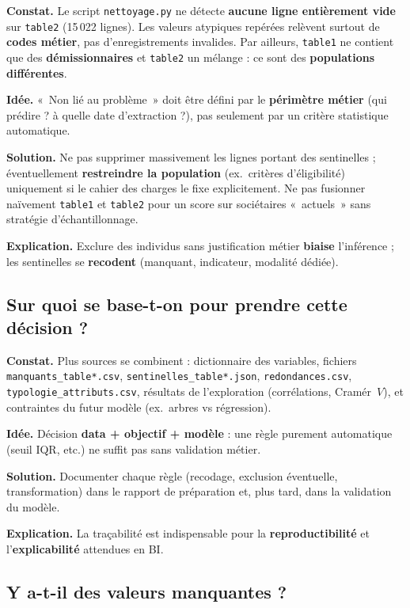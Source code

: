 \documentclass[11pt,a4paper]{article}
\begin{document}
\textbf{Constat.} Le script \texttt{nettoyage.py} ne détecte \textbf{aucune ligne entièrement vide} sur \texttt{table2} (15\,022 lignes). Les valeurs atypiques repérées relèvent surtout de \textbf{codes métier}, pas d'enregistrements invalides. Par ailleurs, \texttt{table1} ne contient que des \textbf{démissionnaires} et \texttt{table2} un mélange : ce sont des \textbf{populations différentes}.

\textbf{Idée.} «~Non lié au problème~» doit être défini par le \textbf{périmètre métier} (qui prédire ? à quelle date d'extraction ?), pas seulement par un critère statistique automatique.

\textbf{Solution.} Ne pas supprimer massivement les lignes portant des sentinelles ; éventuellement \textbf{restreindre la population} (ex.\ critères d'éligibilité) uniquement si le cahier des charges le fixe explicitement. Ne pas fusionner naïvement \texttt{table1} et \texttt{table2} pour un score sur sociétaires «~actuels~» sans stratégie d'échantillonnage.

\textbf{Explication.} Exclure des individus sans justification métier \textbf{biaise} l'inférence ; les sentinelles se \textbf{recodent} (manquant, indicateur, modalité dédiée).

\subsection{Sur quoi se base-t-on pour prendre cette décision ?}

\textbf{Constat.} Plus sources se combinent : dictionnaire des variables, fichiers \texttt{manquants\_table*.csv}, \texttt{sentinelles\_table*.json}, \texttt{redondances.csv}, \texttt{typologie\_attributs.csv}, résultats de l'exploration (corrélations, Cramér~$V$), et contraintes du futur modèle (ex.\ arbres vs régression).

\textbf{Idée.} Décision \textbf{data + objectif + modèle} : une règle purement automatique (seuil IQR, etc.) ne suffit pas sans validation métier.

\textbf{Solution.} Documenter chaque règle (recodage, exclusion éventuelle, transformation) dans le rapport de préparation et, plus tard, dans la validation du modèle.

\textbf{Explication.} La traçabilité est indispensable pour la \textbf{reproductibilité} et l'\textbf{explicabilité} attendues en BI.

\subsection{Y a-t-il des valeurs manquantes ?}
\end{document}

